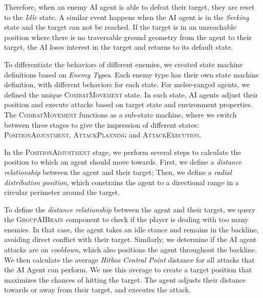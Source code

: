 Therefore, when an enemy AI agent is able to defeat their target, they are reset to the \emph{Idle} state. A similar event happens when the AI agent is in the \emph{Seeking} state and the target can not be reached. If the target is in an unreachable position where there is no traversable ground geometry from the agent to their target, the AI loses interest in the target and returns to its default state.

To differentiate the behaviors of different enemies, we created state machine definitions based on \emph{Enemy Types}. Each enemy type has their own state machine definition, with different behaviors for each state. For melee-ranged agents, we defined the unique \textsc{CombatMovement} state. In such state, AI agents adjust their position and execute attacks based on target state and environment properties. The \textsc{CombatMovement} functions as a sub-state machine, where we switch between three stages to give the impression of different states: \textsc{PositionAdjustment}, \textsc{AttackPlanning} and \textsc{AttackExecution}.

In the \textsc{PositionAdjustment} stage, we perform several steps to calculate the position to which an agent should move towards. First, we define a \emph{distance relationship} between the agent and their target; Then, we define a \emph{radial distribution position}, which constrains the agent to a directional range in a circular perimeter around the target.



To define the \emph{distance relationship} between the agent and their target, we query the \textsc{GroupAIBrain} component to check if the player is dealing with too many enemies. In that case, the agent takes an idle stance and remains in the backline, avoiding direct conflict with their target. Similarly, we determine if the AI agent attacks are on \emph{cooldown}, which also positions the agent throughout the backline. We then calculate the average \emph{Hitbox Central Point} distance for all attacks that the AI Agent can perform. We use this average to create a target position that maximizes the chances of hitting the target. The agent adjusts their distance towards or away from their target, and executes the attack.

